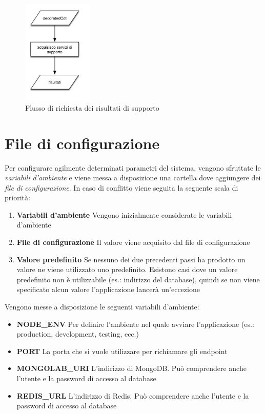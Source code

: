 \begin{figure}[ht]
	\centering
	\includegraphics[width=0.3\textwidth]{5-implementazione-backend/Immagini/diagramma_flusso_servizi_supporto.png}
	\caption{Flusso di richiesta dei risultati di supporto\label{fig:flusso-servizi-supporto}}
\end{figure}

\section{File di configurazione\label{sec:file-configurazione}}

Per configurare agilmente determinati parametri del sistema, vengono sfruttate le \emph{variabili d'ambiente} e viene messa a disposizione una cartella dove aggiungere dei \emph{file di configurazione}. In caso di conflitto viene seguita la seguente scala di priorità:

\begin{enumerate}
	\item \textbf{Variabili d'ambiente} Vengono inizialmente considerate le variabili d'ambiente
	\item \textbf{File di configurazione} Il valore viene acquisito dal file di configurazione
	\item \textbf{Valore predefinito} Se nessuno dei due precedenti passi ha prodotto un valore ne viene utilizzato uno predefinito. Esistono casi dove un valore predefinito non è utilizzabile (es.: indirizzo del database), quindi se non viene specificato alcun valore l'applicazione lancerà un'eccezione
\end{enumerate}

Vengono messe a disposizione le seguenti variabili d'ambiente:

\begin{itemize}
	\item \textbf{NODE\_ENV} Per definire l'ambiente nel quale avviare l'applicazione (es.: production, development, testing, ecc.)
	\item \textbf{PORT} La porta che si vuole utilizzare per richiamare gli endpoint
	\item \textbf{MONGOLAB\_URI} L'indirizzo di MongoDB. Può comprendere anche l'utente e la password di accesso al database
	\item \textbf{REDIS\_URL} L'indirizzo di Redis. Può comprendere anche l'utente e la password di accesso al database
\end{itemize}

